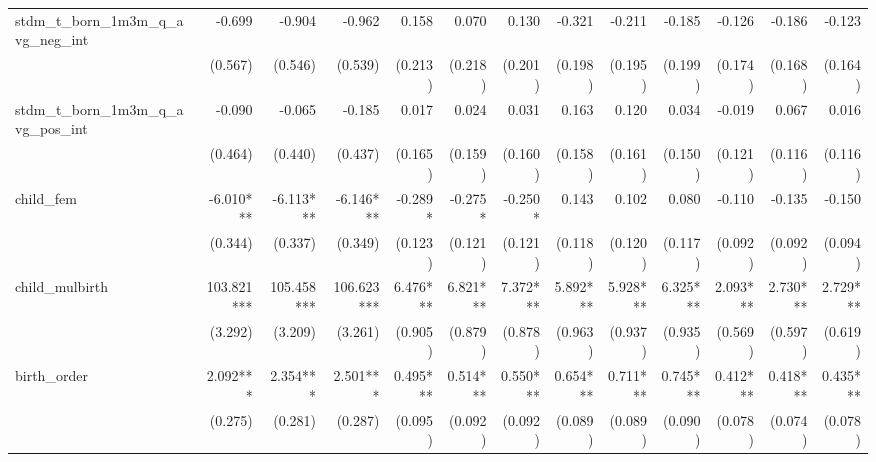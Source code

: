\begin{tabular}{lrrrrrrrrrrrr}
stdm\_t\_born\_1m3m\_q\_avg\_neg\_int       &       -0.699 &       -0.904 &       -0.962 &        0.158 &        0.070 &        0.130 &       -0.321 &       -0.211 &       -0.185 &       -0.126 &       -0.186 &       -0.123 \\ 
                                            &      (0.567) &      (0.546) &      (0.539) &      (0.213) &      (0.218) &      (0.201) &      (0.198) &      (0.195) &      (0.199) &      (0.174) &      (0.168) &      (0.164) \\ 
stdm\_t\_born\_1m3m\_q\_avg\_pos\_int       &       -0.090 &       -0.065 &       -0.185 &        0.017 &        0.024 &        0.031 &        0.163 &        0.120 &        0.034 &       -0.019 &        0.067 &        0.016 \\ 
                                            &      (0.464) &      (0.440) &      (0.437) &      (0.165) &      (0.159) &      (0.160) &      (0.158) &      (0.161) &      (0.150) &      (0.121) &      (0.116) &      (0.116) \\ 
child\_fem                                  &    -6.010*** &    -6.113*** &    -6.146*** &      -0.289* &      -0.275* &      -0.250* &        0.143 &        0.102 &        0.080 &       -0.110 &       -0.135 &       -0.150 \\ 
                                            &      (0.344) &      (0.337) &      (0.349) &      (0.123) &      (0.121) &      (0.121) &      (0.118) &      (0.120) &      (0.117) &      (0.092) &      (0.092) &      (0.094) \\ 
child\_mulbirth                             &   103.821*** &   105.458*** &   106.623*** &     6.476*** &     6.821*** &     7.372*** &     5.892*** &     5.928*** &     6.325*** &     2.093*** &     2.730*** &     2.729*** \\ 
                                            &      (3.292) &      (3.209) &      (3.261) &      (0.905) &      (0.879) &      (0.878) &      (0.963) &      (0.937) &      (0.935) &      (0.569) &      (0.597) &      (0.619) \\ 
birth\_order                                &     2.092*** &     2.354*** &     2.501*** &     0.495*** &     0.514*** &     0.550*** &     0.654*** &     0.711*** &     0.745*** &     0.412*** &     0.418*** &     0.435*** \\ 
                                            &      (0.275) &      (0.281) &      (0.287) &      (0.095) &      (0.092) &      (0.092) &      (0.089) &      (0.089) &      (0.090) &      (0.078) &      (0.074) &      (0.078) \\ 

\end{tabular}
